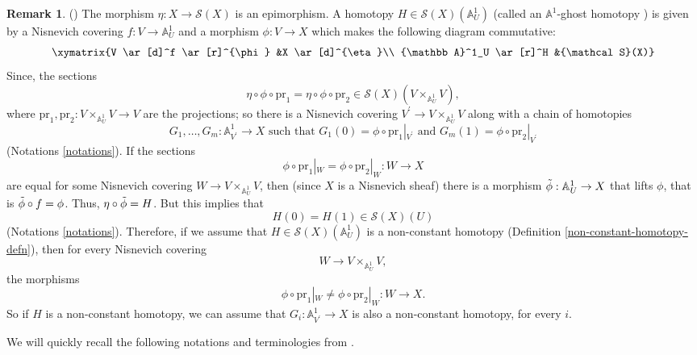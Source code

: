 \documentclass[11pt, reqno]{amsart}
\theoremstyle{plain}
\theoremstyle{definition}
\newtheorem{remark}[thm]{Remark}
\newcommand{\sF}{{\mathcal F}}
\newcommand{\sS}{{\mathcal S}}
\newcommand{\A}{{\mathbb A}}
\begin{document}
\begin{remark} (\cite[Remark 2.6]{choudhury2}) \label{ghost homotopy useful remark}
The morphism $\eta: X \to \sS(X)$ is an epimorphism. A homotopy $H \in \sS(X)(\A^1_U)$ (called an $\A^1$-ghost homotopy \cite[Definition 3.2]{bhs}) is given by a Nisnevich covering $f: V \to \A^1_U$ and a morphism $\phi: V \to X$ which makes the following diagram commutative:
\[
\xymatrix{V \ar[d]^f \ar[r]^{\phi} &X \ar[d]^{\eta}\\
\A^1_U \ar[r]^H &\sS(X)}
\]
Since, the sections
$$ \eta \circ \phi \circ \text{pr}_1 = \eta \circ \phi \circ \text{pr}_2 \in \sS(X)(V \times_{\A^1_U} V),$$
where $\text{pr}_1, \text{pr}_2: V \times_{\A^1_U} V \to V$ are the projections; so there is a Nisnevich covering $V^\prime \to  V \times_{\A^1_U} V$ along with a chain of homotopies
$$G_1, \dots, G_m : \A^1_{V^\prime} \to X \text{ such that } G_1(0)=\phi \circ \text{pr}_1|_{V^\prime} \text{ and }  G_m(1)=\phi \circ \text{pr}_2|_{V^\prime}$$
(Notations \ref{notations}). If the sections 
$$\phi \circ \text{pr}_1|_W = \phi \circ \text{pr}_2|_W: W \to X$$
are equal for some Nisnevich covering $W \to V \times_{\A^1_U} V$, then (since $X$ is a Nisnevich sheaf) there is a morphism $\Tilde{\phi}: \A^1_U \to X$ that lifts $\phi$, that is $\Tilde{\phi} \circ f = \phi$. Thus, $\eta \circ \Tilde{\phi} = H$. But this implies that 
$$H(0) = H(1) \in \sS(X)(U)$$ 
(Notations \ref{notations}). Therefore, if we assume that $H \in \sS(X)(\A^1_U)$ is a non-constant homotopy (Definition \ref{non-constant-homotopy-defn}), then for every Nisnevich covering 
$$W \to  V \times_{\A^1_U} V,$$
 the morphisms
$$\phi \circ \text{pr}_1|_{W} \neq \phi \circ \text{pr}_2|_{W}: W \to X.$$
So if $H$ is a non-constant homotopy, we can assume that $G_i: \A^1_{V^\prime} \to X$ is also a non-constant homotopy, for every $i$.
\end{remark}
We will quickly recall the following notations and terminologies from \cite{choudhury2}.
\end{document}
